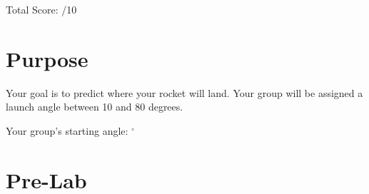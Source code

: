 \documentclass[10pt]{exam}
\begin{document}
  \begin{flushright}
    Total Score: \fillin /10
  \end{flushright}

  \section*{Purpose}

  Your goal is to predict where your rocket will land.  Your group will be assigned a launch angle between 10 and 80 degrees.

  \begin{center}
    Your group's starting angle: \fillin[][3em]$^\circ$
  \end{center}

\section*{Pre-Lab}
\end{document}
